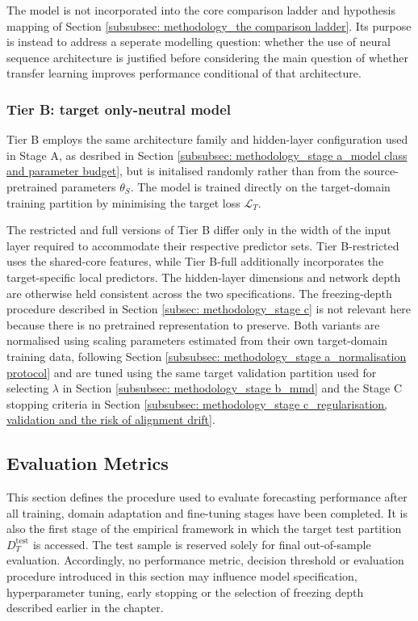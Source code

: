 The model is not incorporated into the core comparison ladder and hypothesis mapping of Section \ref{subsubsec: methodology_the comparison ladder}. Its purpose is instead to address a seperate modelling question: whether the use of neural sequence architecture is justified before considering the main question of whether transfer learning improves performance conditional of that architecture.


\subsubsection{Tier B: target only-neutral model}
Tier B employs the same architecture family and hidden-layer configuration used in Stage A, as desribed in Section \ref{subsubsec: methodology_stage a_model class and parameter budget}, but is initalised randomly rather than from the source-pretrained parameters $\theta_S$. The model is trained directly on the target-domain training partition by minimising the target loss $\mathcal L_T$. 

The restricted and full versions of Tier B differ only in the width of the input layer required to accommodate their respective predictor sets. Tier B-restricted uses the shared-core features, while Tier B-full additionally incorporates the target-specific local predictors. The hidden-layer dimensions and network depth are otherwise held consistent across the two specifications. The freezing-depth procedure described in Section \ref{subsec: methodology_stage c} is not relevant here because there is no pretrained representation to preserve. Both variants are normalised using scaling parameters estimated from their own target-domain training data, following Section \ref{subsubsec: methodology_stage a_normalisation protocol} and are tuned using the same target validation partition used for selecting $\lambda$ in Section \ref{subsubsec: methodology_stage b_mmd} and the Stage C stopping criteria in Section \ref{subsubsec: methodology_stage c_regularisation, validation and the risk of alignment drift}.

\subsection{Evaluation Metrics} \label{subsec: methodology_evaluation metrics}
This section defines the procedure used to evaluate forecasting performance after all training, domain adaptation and fine-tuning stages have been completed. It is also the first stage of the empirical framework in which the target test partition $D_T^\text{test}$ is accessed. The test sample is reserved solely for final out-of-sample evaluation. Accordingly, no performance metric, decision threshold or evaluation procedure introduced in this section may influence model specification, hyperparameter tuning, early stopping or the selection of freezing depth described earlier in the chapter.

